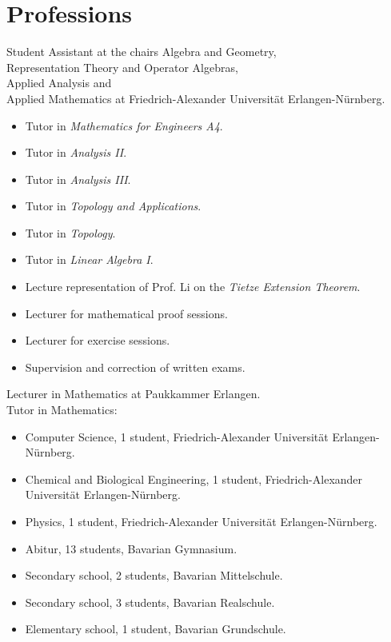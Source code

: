 \documentclass[a4paper, 11pt]{article}
\newcommand{\years}[1]{\marginnote{\scriptsize #1}}
\begin{document}
	\section*{Professions}
	\years{2023--25} Student Assistant at the chairs Algebra and Geometry, \\ Representation
	Theory and Operator Algebras, \\ Applied Analysis and \\ Applied Mathematics at
	Friedrich-Alexander Universität Erlangen-Nürnberg.
	\begin{itemize}
		\item Tutor in \emph{Mathematics for Engineers A4}.

		\item Tutor in \emph{Analysis II}.

		\item Tutor in \emph{Analysis III}.

		\item Tutor in \emph{Topology and Applications}.

		\item Tutor in \emph{Topology}.

		\item Tutor in \emph{Linear Algebra I}.

		\item Lecture representation of Prof. Li on the \emph{Tietze Extension Theorem}.

		\item Lecturer for mathematical proof sessions.

		\item Lecturer for exercise sessions.

		\item Supervision and correction of written exams.
	\end{itemize}
	\years{2025} Lecturer in Mathematics at Paukkammer Erlangen.\\
	\years{2024--25} Tutor in Mathematics:
	\begin{itemize}
		\item Computer Science, 1 student, Friedrich-Alexander Universität Erlangen-Nürnberg.

		\item Chemical and Biological Engineering, 1 student, Friedrich-Alexander Universität Erlangen-Nürnberg.

		\item Physics, 1 student, Friedrich-Alexander Universität Erlangen-Nürnberg.

		\item Abitur, 13 students, Bavarian Gymnasium.

		\item Secondary school, 2 students, Bavarian Mittelschule.

		\item Secondary school, 3 students, Bavarian Realschule.

		\item Elementary school, 1 student, Bavarian Grundschule.
	\end{itemize}
\end{document}
